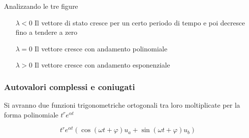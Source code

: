 Analizzando le tre figure
\begin{itemize}
 \item [$\lambda <0$] Il vettore di stato cresce per un certo periodo di tempo
e poi decresce fino a tendere a zero
 \item [$\lambda=0$] Il vettore cresce con andamento polinomiale
 \item [$\lambda>0$] Il vettore cresce con andamento esponenziale
\end{itemize}

\newpage
\subsubsection{Autovalori complessi e coniugati}
Si avranno due funzioni trigonometriche ortogonali tra loro moltiplicate per la
forma polinomiale $t^r e^{\alpha t}$

$$
t^re^{\alpha t} \left(\cos(\omega t +\varphi)u_a + \sin(\omega t
+\varphi)u_b\right)
$$

